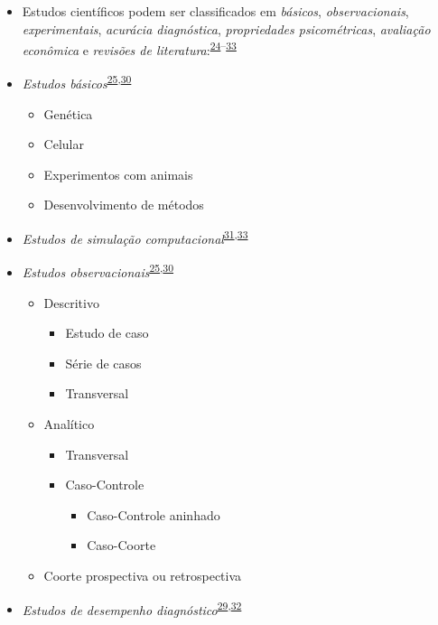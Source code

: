 \documentclass[
  a4paper,
]{book}
\begin{document}
\begin{itemize}
\item
  Estudos científicos podem ser classificados em \emph{básicos}, \emph{observacionais}, \emph{experimentais}, \emph{acurácia diagnóstica}, \emph{propriedades psicométricas}, \emph{avaliação econômica} e \emph{revisões de literatura}:\textsuperscript{\protect\hyperlink{ref-Grant2009}{24}--\protect\hyperlink{ref-chipman2022}{33}}
\item
  \emph{Estudos básicos}\textsuperscript{\protect\hyperlink{ref-Suxfct2014}{25},\protect\hyperlink{ref-Chidambaram2019}{30}}

  \begin{itemize}
  \item
    Genética
  \item
    Celular
  \item
    Experimentos com animais
  \item
    Desenvolvimento de métodos
  \end{itemize}
\item
  \emph{Estudos de simulação computacional}\textsuperscript{\protect\hyperlink{ref-Erdemir2020}{31},\protect\hyperlink{ref-chipman2022}{33}}
\item
  \emph{Estudos observacionais}\textsuperscript{\protect\hyperlink{ref-Suxfct2014}{25},\protect\hyperlink{ref-Chidambaram2019}{30}}

  \begin{itemize}
  \item
    Descritivo

    \begin{itemize}
    \item
      Estudo de caso
    \item
      Série de casos
    \item
      Transversal
    \end{itemize}
  \item
    Analítico

    \begin{itemize}
    \item
      Transversal
    \item
      Caso-Controle

      \begin{itemize}
      \item
        Caso-Controle aninhado
      \item
        Caso-Coorte
      \end{itemize}
    \end{itemize}
  \item
    Coorte prospectiva ou retrospectiva
  \end{itemize}
\item
  \emph{Estudos de desempenho diagnóstico}\textsuperscript{\protect\hyperlink{ref-Chassuxe92019}{29},\protect\hyperlink{ref-Yang2021}{32}}


\end{itemize}
\end{document}
